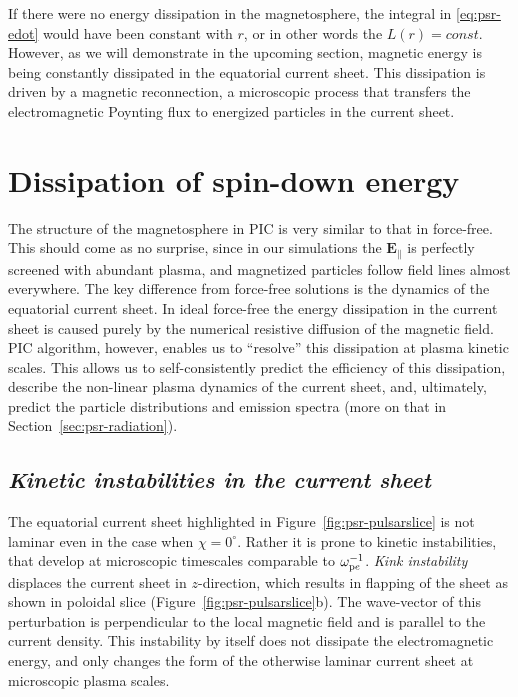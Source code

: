 If there were no energy dissipation in the magnetosphere, the integral in \eqref{eq:psr-edot} would have been constant with $r$, or in other words the $L(r)=const$. However, as we will demonstrate in the upcoming section, magnetic energy is being constantly dissipated in the equatorial current sheet. This dissipation is driven by a magnetic reconnection, a microscopic process that transfers the electromagnetic Poynting flux to energized particles in the current sheet.

\section{Dissipation of spin-down energy}
\label{sec:psr-dissipation}

The structure of the magnetosphere in PIC is very similar to that in force-free. This should come as no surprise, since in our simulations the $\bm{E}_\parallel$ is perfectly screened with abundant plasma, and magnetized particles follow field lines almost everywhere. The key difference from force-free solutions is the dynamics of the equatorial current sheet. In ideal force-free the energy dissipation in the current sheet is caused purely by the numerical resistive diffusion of the magnetic field. PIC algorithm, however, enables us to ``resolve'' this dissipation at plasma kinetic scales. This allows us to self-consistently predict the efficiency of this dissipation, describe the non-linear plasma dynamics of the current sheet, and, ultimately, predict the particle distributions and emission spectra (more on that in Section~\ref{sec:psr-radiation}). 

\subsection*{\small\it Kinetic instabilities in the current sheet}

The equatorial current sheet highlighted in Figure~\ref{fig:psr-pulsarslice} is not laminar even in the case when $\chi=0^\circ$. Rather it is prone to kinetic instabilities, that develop at microscopic timescales comparable to $\omega_{{\rm p}e}^{-1}$. \emph{Kink instability} displaces the current sheet in $z$-direction, which results in flapping of the sheet as shown in poloidal slice (Figure~\ref{fig:psr-pulsarslice}b). The wave-vector of this perturbation is perpendicular to the local magnetic field and is parallel to the current density. This instability by itself does not dissipate the electromagnetic energy, and only changes the form of the otherwise laminar current sheet at microscopic plasma scales. 

